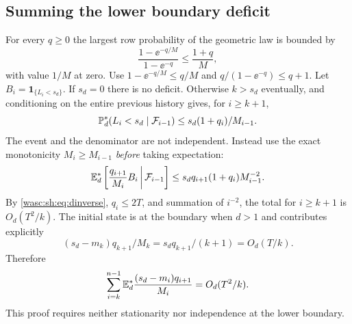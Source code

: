 \documentclass[11pt,a4paper]{article}
\theoremstyle{remark}\newtheorem{remark}[theorem]{Remark}
\newcommand{\ind}{\mathbf 1}\newcommand{\wasc}{\operatorname{wasc}}\newcommand{\dasc}{\operatorname{dasc}}
\numberwithin{equation}{section}
\begin{document}
\subsection{Summing the lower boundary deficit}
For every $q\ge0$ the largest row probability of the geometric law is bounded by
\begin{equation}\label{wasc:sh:eq:drowmax}
\frac{1-\ee^{-q/M}}{1-\ee^{-q}}\le\frac{1+q}{M},
\end{equation}
with value $1/M$ at zero. Use $1-\ee^{-q/M}\le q/M$ and $q/(1-\ee^{-q})\le q+1$. Let $B_i=\ind_{\{L_i<s_d\}}$. If $s_d=0$ there is no deficit. Otherwise $k>s_d$ eventually, and conditioning on the entire previous history gives, for $i\ge k+1$,
\[
\mathbb P_d^*(L_i<s_d\mid\mathcal F_{i-1})
\le s_d(1+q_i)/M_{i-1}.
\]
The event and the denominator are not independent. Instead use the exact monotonicity $M_i\ge M_{i-1}$ \emph{before} taking expectation:
\begin{equation}\label{wasc:sh:eq:dboundaryconditional}
\mathbb E_d^*\left[\frac{q_{i+1}}{M_i}B_i\,\middle|\,\mathcal F_{i-1}\right]
\le s_d q_{i+1}(1+q_i)M_{i-1}^{-2}.
\end{equation}
By \eqref{wasc:sh:eq:dinverse}, $q_i\le2T$, and summation of $i^{-2}$, the total for $i\ge k+1$ is $O_d(T^2/k)$. The initial state is at the boundary when $d>1$ and contributes explicitly
\[
(s_d-m_k)q_{k+1}/M_k=s_dq_{k+1}/(k+1)=O_d(T/k).
\]
Therefore
\begin{equation}\label{wasc:sh:eq:dboundarytotal}
\sum_{i=k}^{n-1}\mathbb E_d^*\frac{(s_d-m_i)q_{i+1}}{M_i}=O_d(T^2/k).
\end{equation}
This proof requires neither stationarity nor independence at the lower boundary.
\end{document}
